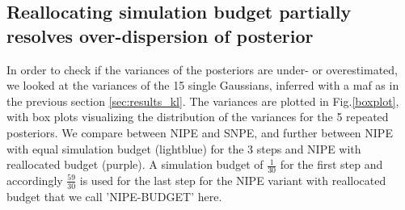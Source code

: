 \documentclass[12pt]{extreport}
\begin{document}

        
        

        

        
        



\subsection{Reallocating simulation budget partially resolves over-dispersion of posterior}
\label{subsec:cal}

In order to check if the variances of the posteriors are under- or overestimated, we looked at the variances of the 15 single Gaussians, inferred with a maf as in the previous section \ref{sec:results_kl}. The variances are plotted in Fig.\ref{boxplot}, with box plots visualizing the distribution of the variances for the 5 repeated posteriors. We compare between NIPE and SNPE, and further between NIPE with equal simulation budget (lightblue) for the 3 steps and NIPE with reallocated budget (purple). A simulation budget of $\frac{1}{30}$ for the first step and accordingly $\frac{59}{30}$ is used for the last step for the NIPE variant with reallocated budget that we call 'NIPE-BUDGET' here.  \\
\end{document}
